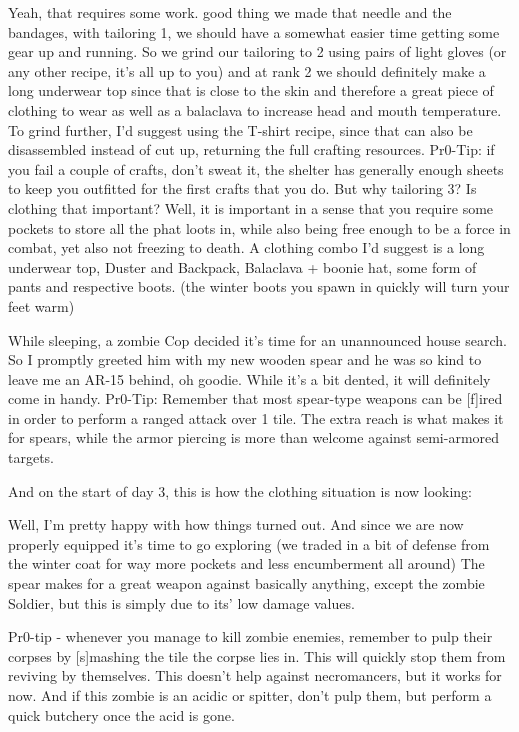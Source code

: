 \documentclass[11pt]{report}
\begin{document}
Yeah, that requires some work. good thing we made that needle and the bandages, with tailoring 1, we should have a somewhat easier time getting some gear up and running. So we grind our tailoring to 2 using pairs of light gloves (or any other recipe, it's all up to you) and at rank 2 we should definitely  make a long underwear top since that is close to the skin and therefore a great piece of clothing to wear as well as a balaclava to increase head and mouth temperature.
To grind further, I'd suggest using the T-shirt recipe, since that can also be disassembled instead of cut up, returning the full crafting resources.
Pr0-Tip: if you fail a couple of crafts, don't sweat it, the shelter has generally enough sheets to keep you outfitted for the first crafts that you do.
But why tailoring 3? Is clothing that important? Well, it is important in a sense that you require some pockets to store all the phat loots in, while also being free enough to be a force in combat, yet also not freezing to death. A clothing combo I'd suggest is a long underwear top, Duster and Backpack, Balaclava + boonie hat, some form of pants and respective boots. (the winter boots you spawn in quickly will turn your feet warm)

While sleeping, a zombie Cop decided it's time for an unannounced house search. So I promptly greeted him with my new wooden spear and he was so kind to leave me an AR-15 behind, oh goodie. While it's a bit dented, it will definitely come in handy.
Pr0-Tip: Remember that most spear-type weapons can be [f]ired in order to perform a ranged attack over 1 tile. The extra reach is what makes it for spears, while the armor piercing is more than welcome against semi-armored targets.

And on the start of day 3, this is how the clothing situation is now looking:


Well, I'm pretty happy with how things turned out. And since we are now properly equipped it's time to go exploring (we traded in a bit of defense from the winter coat for way more pockets and less encumberment all around) The spear makes for a great weapon against basically anything, except the zombie Soldier, but this is simply due to its' low damage values.

Pr0-tip - whenever you manage to kill zombie enemies, remember to pulp their corpses by [s]mashing the tile the corpse lies in. This will quickly stop them from reviving by themselves. This doesn't help against necromancers, but it works for now. And if this zombie is an acidic or spitter, don't pulp them, but perform a quick butchery once the acid is gone.
\end{document}
